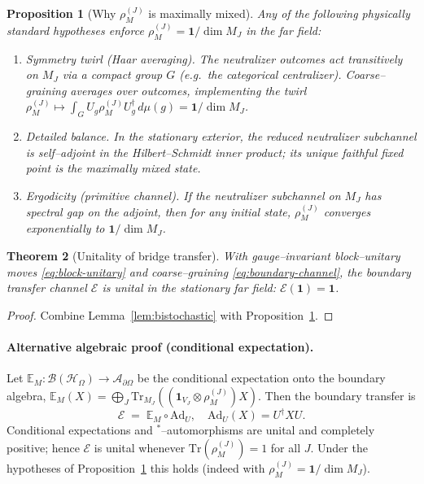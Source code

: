 \documentclass[11pt]{article}
\theoremstyle{plain}
\newtheorem{theorem}{Theorem}[section]
\newtheorem{proposition}[theorem]{Proposition}
\theoremstyle{definition}
\begin{document}
\begin{proposition}[Why $\rho^{(J)}_M$ is maximally mixed]\label{prop:rho-maxmix-physical}
  Any of the following physically standard hypotheses enforce $\rho^{(J)}_M=\mathbf{1}/\dim M_J$ in the far field:
  \begin{enumerate}
    \item \emph{Symmetry twirl (Haar averaging).} The neutralizer outcomes act transitively on $M_J$ via a compact group $G$ (e.g.\ the categorical centralizer). Coarse–graining averages over outcomes, implementing the twirl
      $\rho^{(J)}_M \mapsto \int_G U_g \rho^{(J)}_M U_g^\dagger\, d\mu(g)=\mathbf{1}/\dim M_J$.
    \item \emph{Detailed balance.} In the stationary exterior, the reduced neutralizer subchannel is self–adjoint in the Hilbert–Schmidt inner product; its unique faithful fixed point is the maximally mixed state.
    \item \emph{Ergodicity (primitive channel).} If the neutralizer subchannel on $M_J$ has spectral gap on the adjoint, then for any initial state, $\rho^{(J)}_M$ converges exponentially to $\mathbf{1}/\dim M_J$.
  \end{enumerate}
\end{proposition}

\begin{theorem}[Unitality of bridge transfer]\label{thm:unitality-rigorous}
  With gauge–invariant block–unitary moves \eqref{eq:block-unitary} and coarse–graining \eqref{eq:boundary-channel}, the boundary transfer channel $\mathcal{E}$ is unital in the stationary far field:
  $\mathcal{E}(\mathbf{1})=\mathbf{1}$.
\end{theorem}

\begin{proof}
  Combine Lemma~\ref{lem:bistochastic} with Proposition~\ref{prop:rho-maxmix-physical}.
\end{proof}

\paragraph{Alternative algebraic proof (conditional expectation).}
Let $\mathbb{E}_M:\mathcal{B}(\mathcal{H}_\Omega)\to \mathcal{A}_{\partial\Omega}$ be the conditional expectation onto the boundary algebra,
$\mathbb{E}_M(X)=\bigoplus_J \mathrm{Tr}_{M_J}( (\mathbf{1}_{V_J}\otimes \rho^{(J)}_M) X )$.
Then the boundary transfer is
\[
  \mathcal{E} \;=\; \mathbb{E}_M \circ \mathrm{Ad}_U,
  \quad \mathrm{Ad}_U(X)=U^\dagger X U.
\]
Conditional expectations and $^*$–automorphisms are unital and completely positive; hence $\mathcal{E}$ is unital whenever $\mathrm{Tr}(\rho^{(J)}_M)=1$ for all $J$.
Under the hypotheses of Proposition~\ref{prop:rho-maxmix-physical} this holds (indeed with $\rho^{(J)}_M=\mathbf{1}/\dim M_J$).
\end{document}
